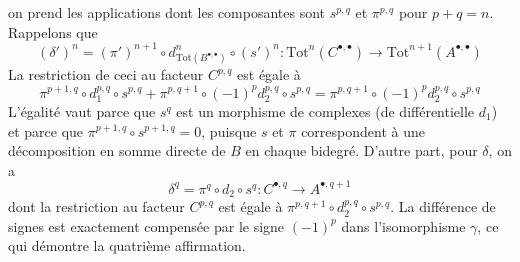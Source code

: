 \begin{remark}
on prend les applications dont les composantes sont $s^{p, q}$ et $\pi^{p, q}$
pour $p + q = n$. Rappelons que
$$
(\delta')^n =
(\pi')^{n + 1} \circ d_{\text{Tot}(B^{\bullet, \bullet})}^n \circ (s')^n :
\text{Tot}^n(C^{\bullet, \bullet}) \to
\text{Tot}^{n + 1}(A^{\bullet, \bullet})
$$
La restriction de ceci au facteur $C^{p, q}$ est égale à
$$
\pi^{p + 1, q} \circ
d_1^{p, q} \circ
s^{p, q} +
\pi^{p, q + 1} \circ
(-1)^p d_2^{p, q} \circ
s^{p, q} =
\pi^{p, q + 1} \circ
(-1)^p d_2^{p, q} \circ
s^{p, q}
$$
L'égalité vaut parce que $s^q$ est un morphisme de complexes (de différentielle $d_1$)
et parce que $\pi^{p + 1, q} \circ s^{p + 1, q} = 0$,
puisque $s$ et $\pi$ correspondent à une décomposition en somme directe de $B$
en chaque bidegré. D'autre part, pour $\delta$, on a
$$
\delta^q =  \pi^q \circ d_2 \circ s^q :
C^{\bullet, q} \to A^{\bullet, q + 1}
$$
dont la restriction au facteur $C^{p, q}$ est égale à
$\pi^{p, q + 1} \circ d_2^{p, q} \circ s^{p, q}$.
La différence de signes est exactement compensée par le signe
$(-1)^p$ dans l'isomorphisme $\gamma$, ce qui démontre la quatrième affirmation.
\end{remark}

